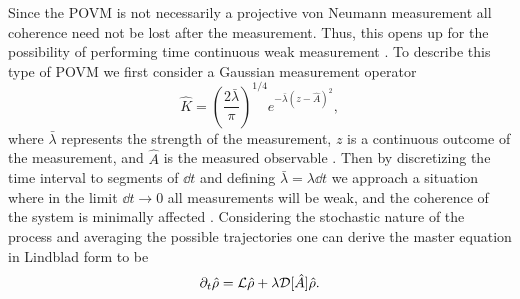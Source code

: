 Since the POVM is not necessarily a projective von Neumann measurement all coherence need not be lost after the measurement. Thus, this opens up for the possibility of performing time continuous weak measurement \cite{Annby-Andersson:2024}. To describe this type of POVM we first consider a Gaussian measurement operator
\begin{equation}
    \hat{K} = \left(\frac{2 \bar{\lambda}}{\pi}\right)^{1/4} e^{-\bar{\lambda}(z - \hat{A})^2},
\end{equation}
where $\bar{\lambda}$ represents the strength of the measurement, $z$ is a continuous outcome of the measurement, and $\hat{A}$ is the measured observable \cite{Annby-Andersson:2024}. Then by discretizing the time interval to segments of $\dd t$ and defining $\bar{\lambda} = \lambda \dd t$ we approach a situation where in the limit $\dd t \to 0$ all measurements will be weak, and the coherence of the system is minimally affected \cite{Annby-Andersson:2024}. Considering the stochastic nature of the process and averaging the possible trajectories one can derive the master equation \cite{Annby-Andersson:2024} in Lindblad form to be 
\begin{equation}
    \partial_t\hat{\rho} = \mathcal{L}\hat{\rho} + \lambda \mathcal{D}[\hat{A}] \hat{\rho}. \label{eq:masterMeas}
\end{equation}

